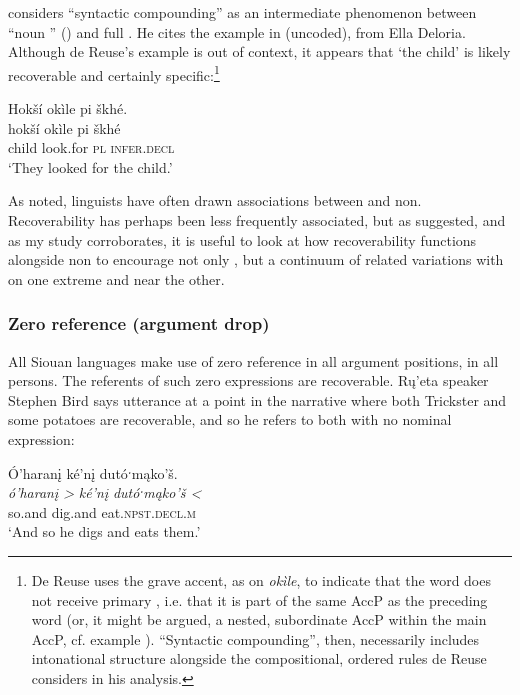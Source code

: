 \documentclass[output=paper]{LSP/langsci}
\begin{document}
\citet{deReuse1994} considers “syntactic compounding” as an intermediate phenomenon between “noun ” () and full . He cites the example in  (uncoded), from Ella Deloria. Although de Reuse’s example is out of context, it appears that `the child' is likely recoverable and certainly specific:\footnote{De Reuse uses the grave accent, as on \emph{okìle}, to indicate that the word does not receive primary , i.e. that it is part of the same AccP as the preceding word (or, it might be argued, a nested, subordinate AccP within the main AccP, cf. example ). “Syntactic compounding”, then, necessarily includes intonational structure alongside the compositional, ordered rules de Reuse considers in his analysis.}

\ea\label{deloriachild}
 	Hokší okìle pi škhé.\footnotemark\\
\gll	hokší		okìle		pi			škhé\\
	child		look.for	\textsc{pl}		\textsc{infer.decl}\\
\glt	`They looked for the child.' 
\z

	As \citet{Graczyk1991a} noted, linguists have often drawn associations between  and non. Recoverability has perhaps been less frequently associated, but as \citet{deReuse1994} suggested, and as my study corroborates, it is useful to look at how recoverability functions alongside non to encourage not only , but a continuum of related variations with  on one extreme and  near the other.
	
\subsubsection{Zero reference (argument drop)}\label{zeroreference}

	All Siouan languages make use of zero reference in all argument positions, in all persons. The referents of such zero expressions are recoverable. Rų’eta speaker Stephen Bird says utterance  at a point in the narrative where both Trickster and some potatoes are recoverable, and so he refers to both with no nominal expression:
	
\ea\label{ruetazero}
 	Ó’haranį ké’nį dutóˑmąko’š.\footnotemark\\
\gll 	\emph{ó’haranį >}	\emph{ké’nį}		\emph{dutóˑmąko’š <}\\
	so.and		dig.and		eat.\textsc{npst.decl.m}\\
\glt	`And so he digs and eats them.'
\z
\end{document}
